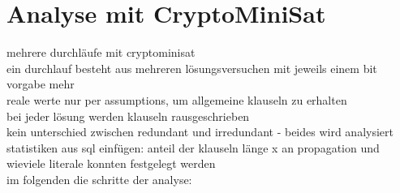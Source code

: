 \chapter{Analyse mit CryptoMiniSat}
\label{chp:analyse}

mehrere durchläufe mit cryptominisat\\
ein durchlauf besteht aus mehreren lösungsversuchen mit jeweils einem bit vorgabe mehr\\
reale werte nur per assumptions, um allgemeine klauseln zu erhalten\\
bei jeder lösung werden klauseln rausgeschrieben\\
kein unterschied zwischen redundant und irredundant - beides wird analysiert\\
statistiken aus sql einfügen: anteil der klauseln länge x an propagation und wieviele literale konnten festgelegt werden\\
im folgenden die schritte der analyse:





